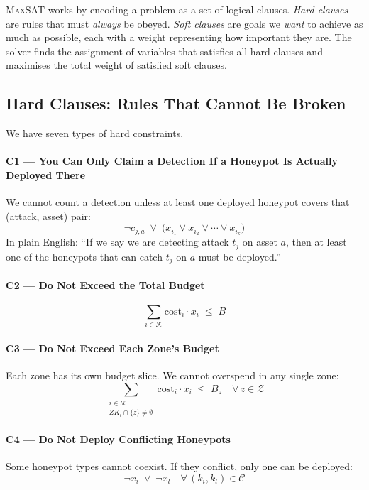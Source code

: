 \documentclass[journal]{IEEEtran}
\newcommand{\maxsat}{\textsc{MaxSAT}}
\newcommand{\calK}{\mathcal{K}}
\newcommand{\calZ}{\mathcal{Z}}
\newcommand{\calC}{\mathcal{C}}
\begin{document}
\maxsat{} works by encoding a problem as a set of logical clauses.
\emph{Hard clauses} are rules that must \emph{always} be obeyed.
\emph{Soft clauses} are goals we \emph{want} to achieve as much as
possible, each with a weight representing how important they are.
The solver finds the assignment of variables that satisfies all
hard clauses and maximises the total weight of satisfied soft
clauses.

\subsection{Hard Clauses: Rules That Cannot Be Broken}

We have seven types of hard constraints.

\paragraph{C1 --- You Can Only Claim a Detection If a Honeypot Is Actually Deployed There}
We cannot count a detection unless at least one deployed honeypot
covers that (attack, asset) pair:
\begin{equation}
  \neg c_{j,a} \;\vee\;
  \bigl(x_{i_1} \vee x_{i_2} \vee \cdots \vee x_{i_k}\bigr)
\end{equation}
In plain English: ``If we say we are detecting attack $t_j$ on asset
$a$, then at least one of the honeypots that can catch $t_j$ on $a$
must be deployed.''

\paragraph{C2 --- Do Not Exceed the Total Budget}
\begin{equation}
  \sum_{i \in \calK} \mathrm{cost}_i \cdot x_i \;\leq\; B
\end{equation}

\paragraph{C3 --- Do Not Exceed Each Zone's Budget}
Each zone has its own budget slice. We cannot overspend in any
single zone:
\begin{equation}
  \sum_{\substack{i \in \calK \\ ZK_i \cap \{z\} \neq \emptyset}}
  \!\!\mathrm{cost}_i \cdot x_i \;\leq\; B_z
  \quad\forall\, z \in \calZ
\end{equation}

\paragraph{C4 --- Do Not Deploy Conflicting Honeypots}
Some honeypot types cannot coexist. If they conflict, only one can
be deployed:
\begin{equation}
  \neg x_i \;\vee\; \neg x_l
  \quad \forall\,(k_i,k_l) \in \calC
\end{equation}
\end{document}
